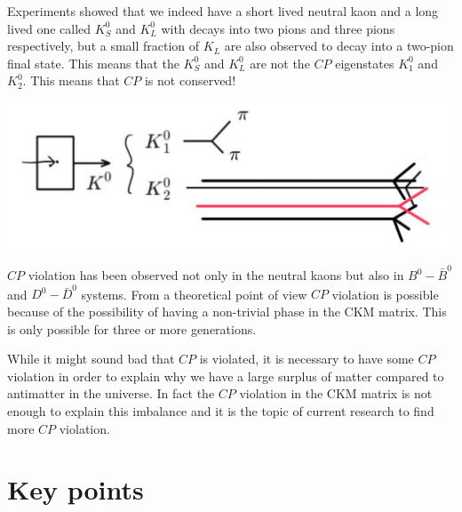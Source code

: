 \documentclass[12pt]{article}
\begin{document}
Experiments showed that we indeed have a short lived neutral kaon and a long lived one called $K_S^0$ and $K_L^0$ with decays into two pions and three pions respectively, but a small fraction of $K_L$ are also observed to decay into a two-pion final state. This means that the $K_S^0$ and $K_L^0$ are not the $CP$ eigenstates $K_1^0$ and $K_2^0$. This means that $CP$ is not conserved! 
\begin{center}
\includegraphics[scale=0.4]{images/KSKL2.png}
\end{center}

$CP$ violation has been observed not only in the neutral kaons but also in $B^0-\bar B^0$ and $D^0-\bar D^0$ systems. From a theoretical point of view $CP$ violation is possible because of the possibility of having a non-trivial phase in the CKM matrix. This is only possible for three or more generations. 

While it might sound bad that $CP$ is violated, it is necessary to have some $CP$ violation in order to explain why we have a large surplus of matter compared to antimatter in the universe. In fact the $CP$ violation in the CKM matrix is not enough to explain this imbalance and it is the topic of current research to find more $CP$ violation. 
 

\clearpage
\section{Key points}
\end{document}

